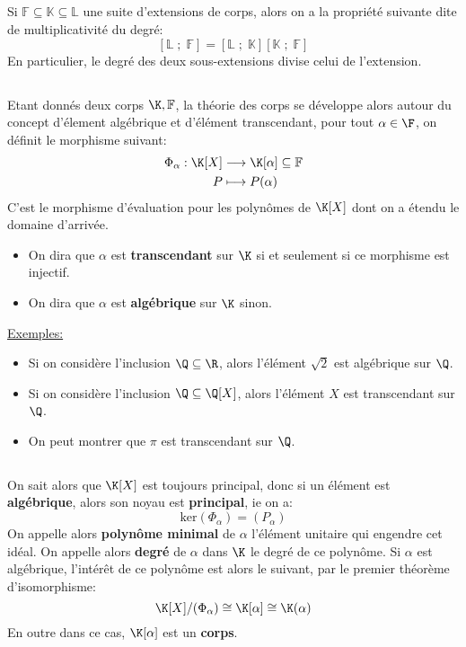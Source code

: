 \subsection*{}
Si \( \mathbb{F} \subseteq \mathbb{K} \subseteq \mathbb{L} \) une suite d'extensions de corps, alors on a la propriété suivante dite de multiplicativité du degré:
\[ 
   [\mathbb{L} \; ; \; \mathbb{F}] = [\mathbb{L} \; ; \; \mathbb{K}][\mathbb{K} \; ; \; \mathbb{F}]
\]
En particulier, le degré des deux sous-extensions divise celui de l'extension.

\subsection*{}
Etant donnés deux corps \( \K, \mathbb{F} \), la théorie des corps se développe alors autour du concept d'élement algébrique et d'élément transcendant, pour tout \( \alpha \in \F \), on définit le morphisme suivant:
\[ 
   \begin{aligned}
      \Phi_\alpha : \K[X] &\longrightarrow \K[\alpha] \subseteq \mathbb{F} \\
      P &\longmapsto P(\alpha)
   \end{aligned} 
\]
C'est le morphisme d'évaluation pour les polynômes de \( \K[X] \) dont on a étendu le domaine d'arrivée.
\begin{itemize}
   \item On dira que \( \alpha \) est \textbf{transcendant} sur \( \K \) si et seulement si ce morphisme est injectif.
   \item On dira que \( \alpha \) est \textbf{algébrique} sur \( \K \) sinon.
\end{itemize}
\uline{Exemples:} 
\begin{itemize}
   \item Si on considère l'inclusion \( \Q \subseteq \R \), alors l'élément \( \sqrt{2} \) est algébrique sur \( \Q \).
   \item Si on considère l'inclusion \( \Q \subseteq \Q[X] \), alors l'élément \( X \) est transcendant sur \( \Q \).
   \item On peut montrer que \( \pi \) est transcendant sur \( \Q \).
\end{itemize}
\subsection*{}
On sait alors que \( \K[X] \) est toujours principal, donc si un élément est \textbf{algébrique}, alors son noyau est \textbf{principal}, ie on a:
\[ 
   \text{ker}(\Phi_\alpha) = (P_\alpha)
\]
On appelle alors \textbf{polynôme minimal} de \( \alpha \) l'élément unitaire qui engendre cet idéal. On appelle alors \textbf{degré} de \( \alpha \) dans \( \K \) le degré de ce polynôme. Si \( \alpha \) est algébrique, l'intérêt de ce polynôme est alors le suivant, par le premier théorème d'isomorphisme:
\[ 
   \K[X]/(\Phi_\alpha) \cong \K[\alpha] \cong \K(\alpha)
\]
En outre dans ce cas, \( \K[\alpha] \) est un \textbf{corps}.

